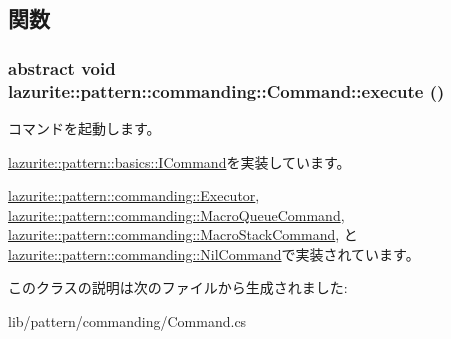 \subsection{関数}
\hypertarget{classlazurite_1_1pattern_1_1commanding_1_1_command_afd9750cf772a6a65b1a1e11d8313fe03}{
\subsubsection[{execute}]{\setlength{\rightskip}{0pt plus 5cm}abstract void lazurite::pattern::commanding::Command::execute ()}}
\label{classlazurite_1_1pattern_1_1commanding_1_1_command_afd9750cf772a6a65b1a1e11d8313fe03}


コマンドを起動します。 

\hyperlink{interfacelazurite_1_1pattern_1_1basics_1_1_i_command_ab89391b5d7cf0be8aabc0f4c8369c8e6}{lazurite::pattern::basics::ICommand}を実装しています。

\hyperlink{classlazurite_1_1pattern_1_1commanding_1_1_executor_a984262e0d3834f29ac687904b16e1d34}{lazurite::pattern::commanding::Executor}, \hyperlink{classlazurite_1_1pattern_1_1commanding_1_1_macro_queue_command_a64af4fe452bfe89416ff8a4459e96d69}{lazurite::pattern::commanding::MacroQueueCommand}, \hyperlink{classlazurite_1_1pattern_1_1commanding_1_1_macro_stack_command_a9a5a088254429cfb113761f06d09fc9f}{lazurite::pattern::commanding::MacroStackCommand}, と \hyperlink{classlazurite_1_1pattern_1_1commanding_1_1_nil_command_a1e4264d6178861597779826267d5ac4c}{lazurite::pattern::commanding::NilCommand}で実装されています。

このクラスの説明は次のファイルから生成されました:\begin{DoxyCompactItemize}
\item 
lib/pattern/commanding/Command.cs\end{DoxyCompactItemize}
